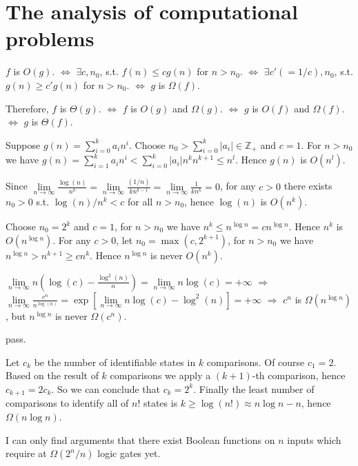 \section{The analysis of computational problems}

\ex $f$ is $O(g)$.
$\Leftrightarrow$
$\exists c,n_0$, s.t. $f(n)\le cg(n)$ for $n>n_0$.
$\Leftrightarrow$
$\exists c'(=1/c),n_0$, s.t. $g(n)\ge c'g(n)$ for $n>n_0$.
$\Leftrightarrow$
$g$ is $\Omega(f)$.

Therefore, $f$ is $\Theta(g)$.
$\Leftrightarrow$
$f$ is $O(g)$ and $\Omega(g)$.
$\Leftrightarrow$
$g$ is $O(f)$ and $\Omega(f)$.
$\Leftrightarrow$
$g$ is $\Theta(f)$.

\ex Suppose $g(n) = \sum_{i=0}^ka_in^i$.
Choose $n_0 > \sum_{i=0}^k|a_i| \in\mathbb{Z}_+$ and $c=1$.
For $n > n_0$ we have $g(n) = \sum_{i=1}^k a_i n^i < \sum_{i=0}^k|a_i|n^k n^{k+1} \le n^l$.
Hence $g(n)$ is $O(n^l)$.

\ex Since $\lim\limits_{n\rightarrow\infty}\frac{\log(n)}{n^k}=\lim\limits_{n\rightarrow\infty}\frac{(1/n)}{kn^{k-1}}=\lim\limits_{n\rightarrow\infty}\frac{1}{kn^k}=0$, for any $c>0$ there exists $n_0>0$ s.t. $\log(n)/n^k<c$ for all $n>n_0$, hence $\log(n)$ is $O(n^k)$.

\ex Choose $n_0=2^k$ and $c=1$, for $n>n_0$ we have $n^k \le n^{\log n} = cn^{\log n}$.
Hence $n^k$ is $O(n^{\log n})$.
For any $c>0$, let $n_0=\max(c,2^{k+1})$, for $n>n_0$ we have $n^{\log n} > n^{k+1} \ge cn^k$.
Hence $n^{\log n}$ is never $O(n^k)$.

\ex $\lim\limits_{n\rightarrow\infty}n\left(\log(c)-\frac{\log^2(n)}{n}\right) = \lim\limits_{n\rightarrow\infty}n\log(c) = +\infty$ 
$\Rightarrow$ 
$\lim\limits_{n\rightarrow\infty}\frac{c^n}{n^{\log(n)}} = \exp\left[\lim\limits_{n\rightarrow\infty}n\log(c)-\log^2(n)\right] = +\infty$ 
$\Rightarrow$ 
$c^n$ is $\Omega(n^{\log n})$, but $n^{\log n}$ is never $\Omega(c^n)$.

\ex pass.

\ex Let $c_k$ be the number of identifiable states in $k$ comparisons.
Of course $c_1 = 2$.
Based on the result of $k$ comparisons we apply a $(k+1)$-th comparison, hence $c_{k+1}=2c_k$.
So we can conclude that $c_k=2^k$.
Finally the least number of comparisons to identify all of $n!$ states is $k\ge\log(n!)\approx n\log n - n$, hence $\Omega(n\log n)$.

\ex \todo I can only find arguments that there exist Boolean
functions on $n$ inputs which require at $\Omega(2^n/n)$ logic gates yet.

